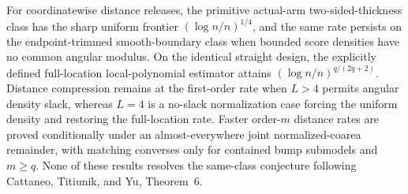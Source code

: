 For coordinatewise distance releases, the primitive actual-arm two-sided-thickness class has the sharp uniform frontier \((\log n/n)^{1/4}\), and the same rate persists on the endpoint-trimmed smooth-boundary class when bounded score densities have no common angular modulus.  On the identical straight design, the explicitly defined full-location local-polynomial estimator attains \((\log n/n)^{q/(2q+2)}\).  Distance compression remains at the first-order rate when \(L>4\) permits angular density slack, whereas \(L=4\) is a no-slack normalization case forcing the uniform density and restoring the full-location rate.  Faster order-\(m\) distance rates are proved conditionally under an almost-everywhere joint normalized-coarea remainder, with matching converses only for contained bump submodels and \(m\geq q\).  None of these results resolves the same-class conjecture following Cattaneo, Titiunik, and Yu, Theorem~6.